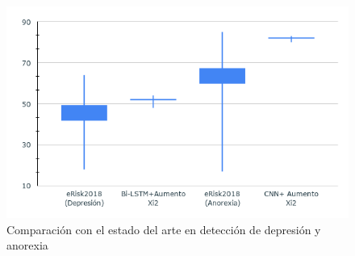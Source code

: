 \begin{figure}[!h]
    \centering
  \includegraphics[scale=0.9]{sections/figures/sticks-state.png}
    \caption{Comparación con el estado del arte en detección de depresión y anorexia}
    \label{fig:state_of_art}
\end{figure}
